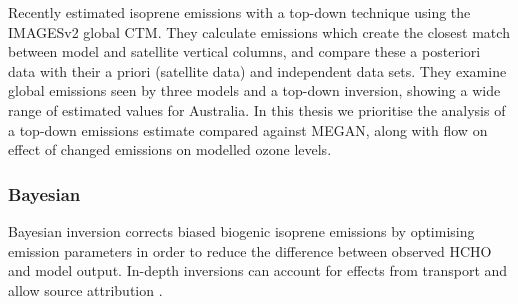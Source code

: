     Recently \textcite{Bauwens2016} estimated isoprene emissions with a top-down technique using the IMAGESv2 global CTM.
    They calculate emissions which create the closest match between model and satellite vertical columns, and compare these a posteriori data with their a priori (satellite data) and independent data sets.
    They examine global emissions seen by three models and a top-down inversion, showing a wide range of estimated values for Australia.
    In this thesis we prioritise the analysis of a top-down emissions estimate compared against MEGAN, along with flow on effect of changed emissions on modelled ozone levels.
    
    \subsubsection{Bayesian}
    
      Bayesian inversion corrects biased biogenic isoprene emissions by optimising emission parameters in order to reduce the difference between observed HCHO and model output.
      In-depth inversions can account for effects from transport and allow source attribution \parencite{FortemsCheiney2012}.
      
